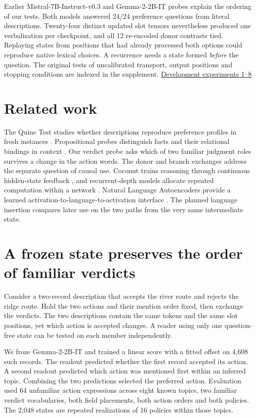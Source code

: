 \documentclass[11pt]{article}
\begin{document}
Earlier Mistral-7B-Instruct-v0.3 and Gemma-2-2B-IT probes explain the ordering of our tests. Both models answered 24/24 preference questions from literal descriptions. Twenty-four distinct updated slot tensors nevertheless produced one verbalization per checkpoint, and all 12 re-encoded donor contrasts tied. Replaying states from positions that had already processed both options could reproduce native lexical choices. A recurrence needs a state formed \emph{before} the question. The original tests of uncalibrated transport, output positions and stopping conditions are indexed in the supplement. \href{https://github.com/RyoSpiralArchitect/self-fold/blob/v1.0.0/paper/DEVELOPMENT_RECORD.md#study-1}{Development experiments 1--8}

\section*{Related work}

The Quine Test studies whether descriptions reproduce preference profiles in fresh instances \citep{babu2026quine}. Propositional probes distinguish facts and their relational bindings in context \citep{feng2024propositional}. Our verdict probe asks which of two familiar judgment roles survives a change in the action words. The donor and branch exchanges address the separate question of causal use. Coconut trains reasoning through continuous hidden-state feedback \citep{hao2024coconut}, and recurrent-depth models allocate repeated computation within a network \citep{geiping2025huginn}. Natural Language Autoencoders provide a learned activation-to-language-to-activation interface \citep{frasertaliente2026nla}. The planned language insertion compares later use on the two paths from the very same intermediate state.

\section{A frozen state preserves the order of familiar verdicts}

Consider a two-record description that accepts the river route and rejects the ridge route. Hold the two actions and their mention order fixed, then exchange the verdicts. The two descriptions contain the same tokens and the same slot positions, yet which action is accepted changes. A reader using only one question-free state can be tested on each member independently.

We froze Gemma-2-2B-IT and trained a linear score with a fitted offset on 4,608 such records. The readout predicted whether the first record accepted its action. A second readout predicted which action was mentioned first within an inferred topic. Combining the two predictions selected the preferred action. Evaluation used 64 unfamiliar action expressions across eight known topics, two familiar verdict vocabularies, both field placements, both action orders and both policies. The 2,048 states are repeated realizations of 16 policies within those topics.
\end{document}
